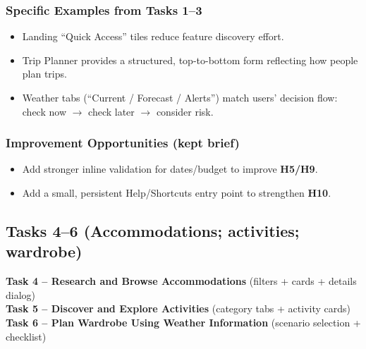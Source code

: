 \documentclass[11pt,a4paper]{article}
\begin{document}
\subsubsection{Specific Examples from Tasks 1--3}
\begin{itemize}
    \item Landing ``Quick Access'' tiles reduce feature discovery effort.
    \item Trip Planner provides a structured, top-to-bottom form reflecting how people plan trips.
    \item Weather tabs (``Current / Forecast / Alerts'') match users' decision flow: check now $\rightarrow$ check later $\rightarrow$ consider risk.
\end{itemize}

\subsubsection{Improvement Opportunities (kept brief)}
\begin{itemize}
    \item Add stronger inline validation for dates/budget to improve \textbf{H5/H9}.
    \item Add a small, persistent Help/Shortcuts entry point to strengthen \textbf{H10}.
\end{itemize}

\subsection{Tasks 4--6 (Accommodations; activities; wardrobe)}
\textbf{Task 4 – Research and Browse Accommodations} (filters + cards + details dialog)\\
\textbf{Task 5 – Discover and Explore Activities} (category tabs + activity cards)\\
\textbf{Task 6 – Plan Wardrobe Using Weather Information} (scenario selection + checklist)
\end{document}
